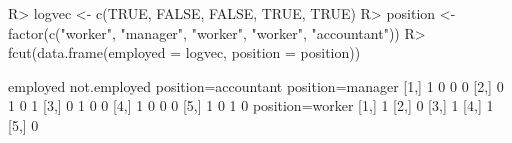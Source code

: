 \begin{Schunk}
% --begin: "fcut.logfact"
\begin{Sinput}
R> logvec <- c(TRUE, FALSE, FALSE, TRUE, TRUE)
R> position <- factor(c("worker", "manager", "worker", "worker", "accountant"))
R> fcut(data.frame(employed = logvec, position = position))
\end{Sinput}
\begin{Soutput}
     employed not.employed position=accountant position=manager
[1,]        1            0                   0                0
[2,]        0            1                   0                1
[3,]        0            1                   0                0
[4,]        1            0                   0                0
[5,]        1            0                   1                0
     position=worker
[1,]               1
[2,]               0
[3,]               1
[4,]               1
[5,]               0
\end{Soutput}
%
% --end: "fcut.logfact"
\end{Schunk}

